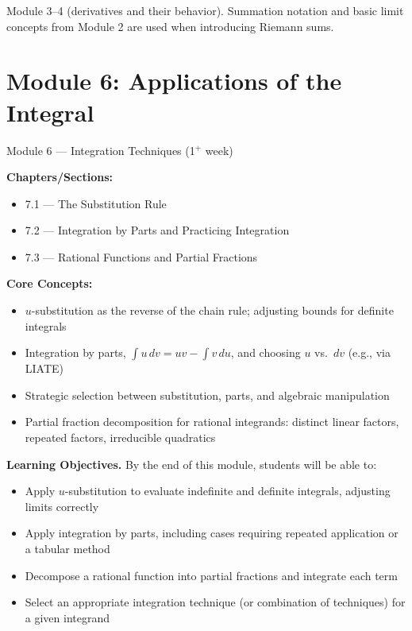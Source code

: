 \documentclass[11pt]{article}
\newcommand{\loheader}{\textbf{Learning Objectives.} By the end of this module, students will be able to:}
\begin{document}
\begin{prereqbox}
Module 3--4 (derivatives and their behavior). Summation notation and basic limit
concepts from Module 2 are used when introducing Riemann sums.
\end{prereqbox}

\section{Module 6: Applications of the Integral}
\label{mod:6}
\begin{modulebox}{Module 6 --- Integration Techniques \hfill (1$^+$ week)}

\textbf{Chapters/Sections:}
\begin{itemize}[nosep]
  \item 7.1 --- The Substitution Rule
  \item 7.2 --- Integration by Parts and Practicing Integration
  \item 7.3 --- Rational Functions and Partial Fractions
\end{itemize}

\textbf{Core Concepts:}
\begin{itemize}[nosep]
  \item $u$-substitution as the reverse of the chain rule; adjusting bounds for definite integrals
  \item Integration by parts, $\int u\,dv = uv - \int v\,du$, and choosing $u$ vs.\ $dv$ (e.g., via LIATE)
  \item Strategic selection between substitution, parts, and algebraic manipulation
  \item Partial fraction decomposition for rational integrands: distinct linear factors, repeated factors, irreducible quadratics
\end{itemize}

\loheader
\begin{itemize}[nosep]
  \item Apply $u$-substitution to evaluate indefinite and definite integrals, adjusting limits correctly
  \item Apply integration by parts, including cases requiring repeated application or a tabular method
  \item Decompose a rational function into partial fractions and integrate each term
  \item Select an appropriate integration technique (or combination of techniques) for a given integrand
\end{itemize}
\end{modulebox}
\end{document}

